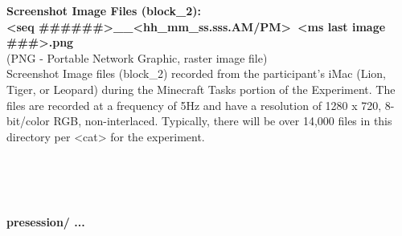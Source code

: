 \begin{description}
\begin{addmargin}[0em]{0em}
    \begin{addmargin}[1em]{0em} %
        \textbf{Screenshot Image Files (block\_2):\\<seq \#\#\#\#\#\#>\_<yyyy-mm-dd>\_<hh\_mm\_ss.sss.AM/PM>~<ms last image \#\#\#>.png}\\
        (PNG - Portable Network Graphic, raster image file)\\
        Screenshot Image files (block\_2) recorded from the participant's iMac (Lion, Tiger, or Leopard)
        during the Minecraft Tasks portion of the Experiment.
        The files are recorded at a frequency of 5Hz and have a resolution of 1280 x 720, 8-bit/color RGB, non-interlaced.
        Typically, there will be over 14,000 files in this directory per <cat> for the experiment. 
    \end{addmargin} %

\end{addmargin} %


\textbf{\\\\\\}
\begin{addmargin}[0em]{0em} %
    \textbf{presession/ ... }


\end{addmargin}
\end{description}
